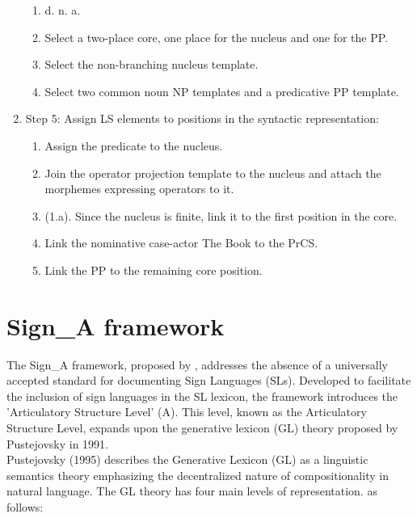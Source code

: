 \begin{enumerate}
\begin{enumerate}
          \item d. n. a.
           \item Select a two-place core, one place for the nucleus and one for the PP.
            \item Select the non-branching nucleus template.
             \item Select two common noun NP templates and a predicative PP template.
    \end{enumerate}
\item Step 5: Assign LS elements to positions in the syntactic representation:
    \begin{enumerate}
         \item Assign the predicate to the nucleus.
         \item Join the operator projection template to the nucleus and attach the
            morphemes expressing operators to it.
         \item (1.a). Since the nucleus is finite, link it to the first position in the core.
         \item Link the nominative case-actor The Book to the PrCS.
         \item Link the PP to the remaining core position.
\end{enumerate}
\end{enumerate}

\section{Sign\_A framework}

The Sign\_A framework, proposed by \parencite{murtagh2019linguistically}, addresses the absence of a universally accepted standard for documenting Sign Languages (SLs). Developed to facilitate the inclusion of sign languages in the SL lexicon, the framework introduces the 'Articulatory Structure Level' (A). This level, known as the Articulatory Structure Level, expands upon the generative lexicon (GL) theory proposed by Pustejovsky in 1991. \\

Pustejovsky (1995) describes the Generative Lexicon (GL) as a linguistic semantics theory emphasizing the decentralized nature of compositionality in natural language. The GL theory has four main levels of representation. as follows: 


